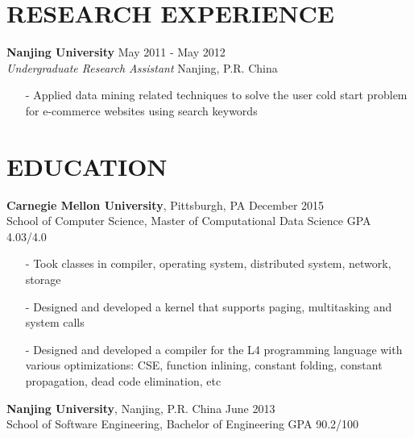 \documentclass[mm, 7pt]{resume} %
\begin{document}
\begin{resume}
 
\section{RESEARCH EXPERIENCE}

\textbf{Nanjing University}       \hfill  May 2011 - May 2012 \\
{\sl Undergraduate Research Assistant}  \hfill  Nanjing, P.R. China
\begin{itemize} \itemsep -2pt
\item[-] Applied data mining related techniques to solve the user cold start problem for e-commerce websites using search keywords
\end{itemize}

 
\section{EDUCATION}

\textbf{Carnegie Mellon University}, Pittsburgh, PA \hfill December 2015 \\
School of Computer Science, Master of Computational Data Science \hfill GPA 4.03/4.0
\begin{itemize} \itemsep -2pt
\item[-] Took classes in compiler, operating system, distributed system, network, storage
\item[-] Designed and developed a kernel that supports paging, multitasking and system calls
\item[-] Designed and developed a compiler for the L4 programming language with various optimizations: CSE, function inlining, constant folding, constant propagation, dead code elimination, etc
\end{itemize}

\textbf{Nanjing University}, Nanjing, P.R. China \hfill June 2013 \\
School of Software Engineering, Bachelor of Engineering \hfill GPA 90.2/100


\end{resume}
\end{document}
